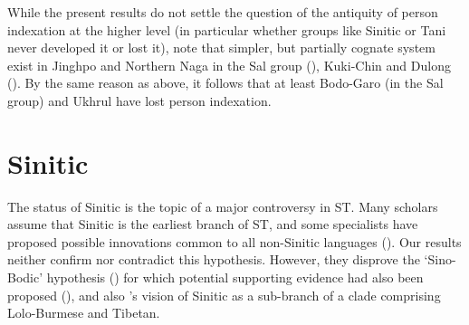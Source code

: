 \documentclass[oneside,a4paper,11pt]{article}
\begin{document}
While the present results do not settle the question of the antiquity of person indexation at the higher level (in particular whether groups like Sinitic or Tani never developed it or lost it), note that simpler, but partially cognate system exist in Jinghpo and Northern Naga in the Sal group (\citealt{delancey11nocte}), Kuki-Chin and Dulong (\citealt{delancey10agreement}). By the same reason as above, it follows that at least Bodo-Garo (in the Sal group) and Ukhrul have lost person indexation.

\section{Sinitic}
The status of Sinitic is the topic of a major controversy in ST. Many scholars assume that Sinitic is the earliest branch of ST, and some specialists have proposed possible innovations common to all non-Sinitic languages (\citealt{handel08st, sagart17candidate}). Our results neither confirm nor contradict this hypothesis. However, they disprove the `Sino-Bodic' hypothesis (\citealt{driem97sinobodic}) for which potential supporting evidence had also been proposed (\citealt{hill14jrn}), and also \citet{post14th}'s vision of Sinitic as a sub-branch of a clade comprising Lolo-Burmese and Tibetan.





\end{document}
